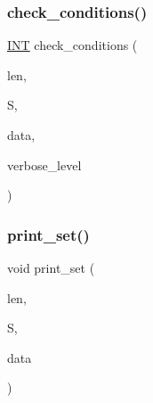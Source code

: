\subsubsection{\texorpdfstring{check\+\_\+conditions()}{check\_conditions()}}
{\footnotesize\ttfamily \mbox{\hyperlink{galois_8h_a09fddde158a3a20bd2dcadb609de11dc}{I\+NT}} check\+\_\+conditions (\begin{DoxyParamCaption}\item[{\mbox{\hyperlink{galois_8h_a09fddde158a3a20bd2dcadb609de11dc}{I\+NT}}}]{len,  }\item[{\mbox{\hyperlink{galois_8h_a09fddde158a3a20bd2dcadb609de11dc}{I\+NT}} $\ast$}]{S,  }\item[{void $\ast$}]{data,  }\item[{\mbox{\hyperlink{galois_8h_a09fddde158a3a20bd2dcadb609de11dc}{I\+NT}}}]{verbose\+\_\+level }\end{DoxyParamCaption})}

\mbox{\label{graph__generator_8_c_a8c1a5fc71aea7ff31d181f0103196a24}} 
\subsubsection{\texorpdfstring{print\+\_\+set()}{print\_set()}}
{\footnotesize\ttfamily void print\+\_\+set (\begin{DoxyParamCaption}\item[{\mbox{\hyperlink{galois_8h_a09fddde158a3a20bd2dcadb609de11dc}{I\+NT}}}]{len,  }\item[{\mbox{\hyperlink{galois_8h_a09fddde158a3a20bd2dcadb609de11dc}{I\+NT}} $\ast$}]{S,  }\item[{void $\ast$}]{data }\end{DoxyParamCaption})}

